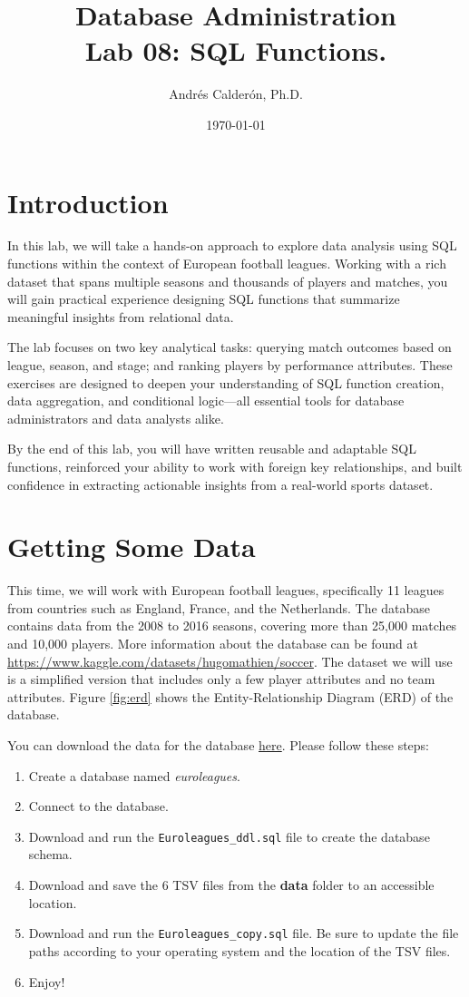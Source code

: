 \documentclass{article}
\title{Database Administration \\ Lab 08: SQL Functions.}
\author{Andrés Calderón, Ph.D.}
\date{\today}
\begin{document}
\maketitle

\section{Introduction}
In this lab, we will take a hands-on approach to explore data analysis using SQL functions within the context of European football leagues. Working with a rich dataset that spans multiple seasons and thousands of players and matches, you will gain practical experience designing SQL functions that summarize meaningful insights from relational data.

The lab focuses on two key analytical tasks: querying match outcomes based on league, season, and stage; and ranking players by performance attributes. These exercises are designed to deepen your understanding of SQL function creation, data aggregation, and conditional logic—all essential tools for database administrators and data analysts alike.

By the end of this lab, you will have written reusable and adaptable SQL functions, reinforced your ability to work with foreign key relationships, and built confidence in extracting actionable insights from a real-world sports dataset.

\section{Getting Some Data}
This time, we will work with European football leagues, specifically 11 leagues from countries such as England, France, and the Netherlands. The database contains data from the 2008 to 2016 seasons, covering more than 25,000 matches and 10,000 players.
More information about the database can be found at \url{https://www.kaggle.com/datasets/hugomathien/soccer}. The dataset we will use is a simplified version that includes only a few player attributes and no team attributes. Figure \ref{fig:erd} shows the Entity-Relationship Diagram (ERD) of the database.

You can download the data for the database \href{https://drive.google.com/drive/folders/12KoKu76ZDpIoDtE78Lc6g6Y2y0zTJJbO?usp=sharing}{here}. Please follow these steps:

\begin{enumerate}
    \item Create a database named \textit{euroleagues}.
    \item Connect to the database.
    \item Download and run the \texttt{Euroleagues\_ddl.sql} file to create the database schema.
    \item Download and save the 6 TSV files from the \textbf{data} folder to an accessible location.
    \item Download and run the \texttt{Euroleagues\_copy.sql} file. Be sure to update the file paths according to your operating system and the location of the TSV files.
    \item Enjoy!
\end{enumerate}
\end{document}

